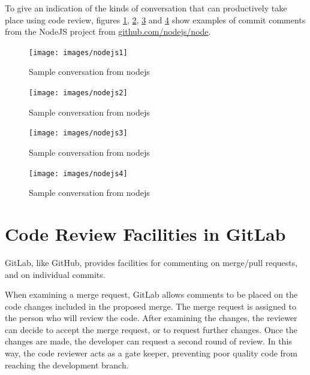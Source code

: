 \documentclass[
]{book}
\begin{document}
To give an indication of the kinds of conversation that can productively take place using code review, figures \ref{fig:nodejs1-fig}, \ref{fig:nodejs2-fig}, \ref{fig:nodejs3-fig} and \ref{fig:nodejs4-fig} show examples of commit comments from the NodeJS project from \href{https://github.com/nodejs/node}{github.com/nodejs/node}.

\begin{figure}

{\centering \texttt{[image: images/nodejs1]} 

}

\caption{Sample conversation from nodejs}\label{fig:nodejs1-fig}
\end{figure}
\begin{figure}

{\centering \texttt{[image: images/nodejs2]} 

}

\caption{Sample conversation from nodejs}\label{fig:nodejs2-fig}
\end{figure}

\begin{figure}

{\centering \texttt{[image: images/nodejs3]} 

}

\caption{Sample conversation from nodejs}\label{fig:nodejs3-fig}
\end{figure}

\begin{figure}

{\centering \texttt{[image: images/nodejs4]} 

}

\caption{Sample conversation from nodejs}\label{fig:nodejs4-fig}
\end{figure}

\hypertarget{gitlabrev}{%
\section{Code Review Facilities in GitLab}\label{gitlabrev}}

GitLab, like GitHub, provides facilities for commenting on merge/pull requests, and on individual commits.

When examining a merge request, GitLab allows comments to be placed on the code changes included in the proposed merge. The merge request is assigned to the person who will review the code. After examining the changes, the reviewer can decide to accept the merge request, or to request further changes. Once the changes are made, the developer can request a second round of review. In this way, the code reviewer acts as a gate keeper, preventing poor quality code from reaching the development branch.
\end{document}
